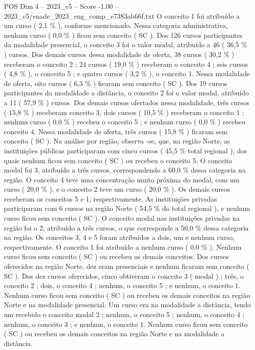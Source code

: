 \begin{textsample}{POS Dim 4 – 2023\_c5 – Score -1.00 – 2023\_c5/enade\_2023\_eng\_comp\_e7383ab66f.txt}
O conceito 1 foi atribuído a um curso ( 2,1 \% ), conforme mencionado.
Nessa categoria administrativa, nenhum curso ( 0,0 \% ) ficou sem conceito ( SC ).
Dos 126 cursos participantes da modalidade presencial, o conceito 3 foi o valor modal, atribuído a 46 ( 36,5 \% ) cursos.
Dos demais cursos dessa modalidade de oferta, 38 cursos ( 30,2 \% ) receberam o conceito 2 ; 24 cursos ( 19,0 \% ) receberam o conceito 4 ; seis cursos ( 4,8 \% ), o conceito 5 ; e quatro cursos ( 3,2 \% ), o conceito 1.
Nessa modalidade de oferta, oito cursos ( 6,3 \% ) ficaram sem conceito ( SC ).
Dos 19 cursos participantes da modalidade a distância, o conceito 2 foi o valor modal, atribuído a 11 ( 57,9 \% ) cursos.
Dos demais cursos ofertados nessa modalidade, três cursos ( 15,8 \% ) receberam conceito 3, dois cursos ( 10,5 \% ) receberam o conceito 1 ; nenhum curso ( 0,0 \% ) recebeu o conceito 5 ; e nenhum curso ( 0,0 \% ) recebeu conceito 4.
Nessa modalidade de oferta, três cursos ( 15,8 \% ) ficaram sem conceito ( SC ).
Na análise por região, observa -se, que, na região Norte, as instituições públicas participaram com cinco cursos ( 45,5 \% total regional ), dos quais nenhum ficou sem conceito ( SC ) ou recebeu o conceito 5.
O conceito modal foi 3, atribuído a três cursos, correspondendo a 60,0 \% dessa categoria na região.
O conceito 4 teve uma concentração muito próxima do modal, com um curso ( 20,0 \% ), e o conceito 2 teve um curso ( 20,0 \% ).
Os demais cursos receberam os conceitos 5 e 1, respectivamente.
As instituições privadas participaram com 6 cursos na região Norte ( 54,5 \% do total regional ), e nenhum curso ficou sem conceito ( SC ).
O conceito modal nas instituições privadas na região foi o 2, atribuído a três cursos, o que corresponde a 50,0 \% dessa categoria na região.
Os conceitos 3, 4 e 5 foram atribuídos a dois, um e nenhum curso, respectivamente.
O conceito 1 foi atribuído a nenhum curso ( 0,0 \% ).
Nenhum curso ficou sem conceito ( SC ) ou recebeu os demais conceitos.
Dos cursos oferecidos na região Norte, dez eram presenciais e nenhum ficaram sem conceito ( SC ).
Dos dez cursos oferecidos, cinco obtiveram o conceito 3 ( modal ) ; três, o conceito 2 ; dois, o conceito 4 ; nenhum, o conceito 5 ; e nenhum, o conceito 1.
Nenhum curso ficou sem conceito ( SC ) ou recebeu os demais conceitos na região Norte e na modalidade presencial.
Um curso era na modalidade a distância, tendo um recebido o conceito modal 2 ; nenhum, o conceito 5 ; nenhum, o conceito 4 ; nenhum, o conceito 3 ; e nenhum, o conceito 1.
Nenhum curso ficou sem conceito ( SC ) ou recebeu os demais conceitos na região Norte e na modalidade a distância.

\end{textsample}
